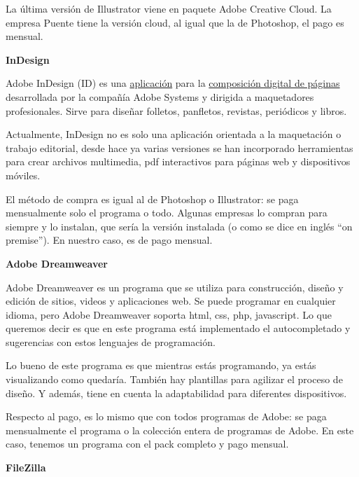 \documentclass{article}
\begin{document}
La última versión de Illustrator viene en paquete Adobe Creative Cloud. La empresa Puente tiene la versión cloud, al igual que la de Photoshop, el pago es mensual.

\vspace{5mm}

\textbf{InDesign}

Adobe InDesign (ID) es una \href{https://es.wikipedia.org/wiki/Aplicaci\%C3\%B3n_inform\%C3\%A1tica}{aplicación} para la \href{https://es.wikipedia.org/wiki/Maquetaci\%C3\%B3n\_(edici\%C3\%B3n)}{composición digital de páginas} desarrollada por la compañía Adobe Systems y dirigida a maquetadores profesionales. Sirve para diseñar folletos, panfletos, revistas, periódicos y libros.  

Actualmente, InDesign no es solo una aplicación orientada a la maquetación o trabajo editorial, desde hace ya varias versiones se han incorporado herramientas para crear archivos multimedia, pdf interactivos para páginas web y dispositivos móviles.  

El método de compra es igual al de Photoshop o Illustrator: se paga mensualmente solo el programa o todo. Algunas empresas lo compran para siempre y lo instalan, que sería la versión instalada (o como se dice en inglés “on premise”). En nuestro caso, es de pago mensual.

\vspace{5mm}

\textbf{Adobe Dreamweaver}

Adobe Dreamweaver es un programa que se utiliza para construcción, diseño y edición de sitios, videos y aplicaciones web. Se puede programar en cualquier idioma, pero Adobe Dreamweaver soporta html, css, php, javascript. Lo que queremos decir es que en este programa está implementado el autocompletado y sugerencias con estos lenguajes de programación.  

Lo bueno de este programa es que mientras estás programando, ya estás visualizando como quedaría.  También hay plantillas para agilizar el proceso de diseño. Y además, tiene en cuenta la adaptabilidad para diferentes dispositivos.  

Respecto al pago, es lo mismo que con todos programas de Adobe: se paga mensualmente el programa o la colección entera de programas de Adobe. En este caso, tenemos un programa con el pack completo y pago mensual.  

\vspace{5mm}

\textbf{FileZilla}
\end{document}
